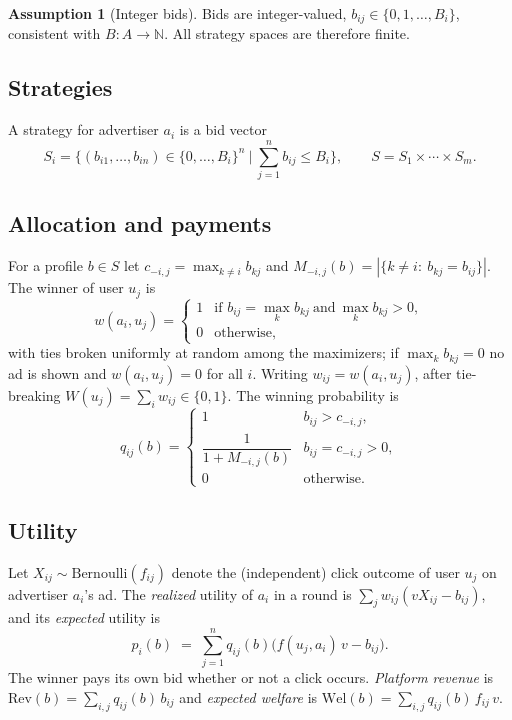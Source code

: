 \documentclass{article}
\theoremstyle{definition}
\newtheorem{assumption}{Assumption}
\theoremstyle{remark}
\newcommand{\N}{\mathbb{N}}
\begin{document}
\begin{assumption}[Integer bids]\label{ass:int}
Bids are integer-valued, $b_{ij}\in\{0,1,\dots,B_i\}$, consistent with $B:A\to\N$. All strategy spaces are therefore finite.
\end{assumption}

\subsection{Strategies}
A strategy for advertiser $a_i$ is a bid vector
\[
S_i=\Big\{(b_{i1},\dots,b_{in})\in\{0,\dots,B_i\}^n\ \Big|\ \sum_{j=1}^n b_{ij}\le B_i\Big\},\qquad S=S_1\times\cdots\times S_m .
\]

\subsection{Allocation and payments}
For a profile $b\in S$ let $c_{-i,j}=\max_{k\neq i}b_{kj}$ and $M_{-i,j}(b)=|\{k\ne i:\ b_{kj}=b_{ij}\}|$. The winner of user $u_j$ is
\[
w(a_i,u_j)=\begin{cases}1 & \text{if } b_{ij}=\max_k b_{kj}\ \text{and}\ \max_k b_{kj}>0,\\ 0 & \text{otherwise,}\end{cases}
\]
with ties broken uniformly at random among the maximizers; if $\max_k b_{kj}=0$ no ad is shown and $w(a_i,u_j)=0$ for all $i$. Writing $w_{ij}=w(a_i,u_j)$, after tie-breaking $W(u_j)=\sum_i w_{ij}\in\{0,1\}$. The winning probability is
\[
q_{ij}(b)=\begin{cases}
1 & b_{ij}>c_{-i,j},\\[2pt]
\dfrac{1}{1+M_{-i,j}(b)} & b_{ij}=c_{-i,j}>0,\\[6pt]
0 & \text{otherwise.}
\end{cases}
\]

\subsection{Utility}
Let $X_{ij}\sim\mathrm{Bernoulli}(f_{ij})$ denote the (independent) click outcome of user $u_j$ on advertiser $a_i$'s ad. The \emph{realized} utility of $a_i$ in a round is $\sum_j w_{ij}(vX_{ij}-b_{ij})$, and its \emph{expected} utility is
\[
p_i(b)\;=\;\sum_{j=1}^{n} q_{ij}(b)\big(f(u_j,a_i)\,v-b_{ij}\big).
\]
The winner pays its own bid whether or not a click occurs. \emph{Platform revenue} is $\mathrm{Rev}(b)=\sum_{i,j}q_{ij}(b)\,b_{ij}$ and \emph{expected welfare} is $\mathrm{Wel}(b)=\sum_{i,j}q_{ij}(b)\,f_{ij}\,v$.
\end{document}
